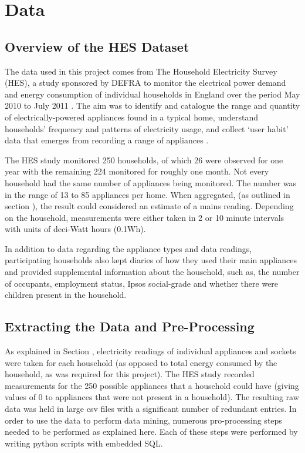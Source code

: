 \chapter{Data}


\section{Overview of the HES Dataset}
The data used in this project comes from The Household Electricity Survey (HES), a study sponsored by DEFRA to monitor the electrical power demand and energy consumption of individual households in England over the period May 2010 to July 2011 \cite{HES}. The aim was to identify and catalogue the range and quantity of electrically-powered appliances found in a typical home, understand households' frequency and patterns of electricity usage, and collect `user habit' data that emerges from recording a range of appliances \cite{early_findings}.

The HES study monitored 250 households, of which 26 were observed for one year with the remaining 224 monitored for roughly one month. Not every household had the same number of appliances being monitored. The number was in the range of 13 to 85 appliances per home. When aggregated, (as outlined in section \aggregationSection), the result could considered an estimate of a mains reading. Depending on the household, measurements were either taken in  2 or 10 minute intervals with units of deci-Watt hours (0.1Wh). 

In addition to data regarding the appliance types and data readings, participating households also kept diaries of how they used their main appliances and provided supplemental information about the household, such as, the number of occupants, employment status, Ipsos social-grade and whether there were children present in the household.


\section{Extracting the Data and Pre-Processing}

As explained in Section \mentionOfAggregationSection, electricity readings of individual appliances and sockets were taken for each household (as opposed to total energy consumed by the household, as was required for this project). The HES study recorded measurements for the 250 possible appliances that a household could have (giving values of 0 to appliances that were not present in a household). The resulting raw data was held in large csv files with a significant number of redundant entries. In order to use the data to perform data mining, numerous pro-processing steps needed to be performed as explained here. Each of these steps were performed by writing python scripts with embedded SQL.

